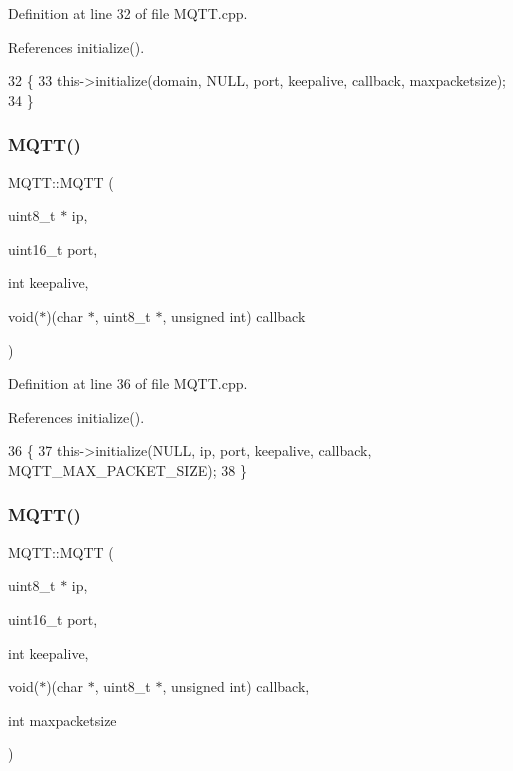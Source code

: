 Definition at line 32 of file M\+Q\+T\+T.\+cpp.



References initialize().


\begin{DoxyCode}
32                                                                                                            
                  \{
33     this->initialize(domain, NULL, port, keepalive, callback, maxpacketsize);
34 \}
\end{DoxyCode}
\mbox{\label{class_m_q_t_t_ad68f2a18a197fa8944e8cc8e1950af5a}} 
\subsubsection{M\+Q\+T\+T()\hspace{0.1cm}{\footnotesize\ttfamily [8/9]}}
{\footnotesize\ttfamily M\+Q\+T\+T\+::\+M\+Q\+TT (\begin{DoxyParamCaption}\item[{uint8\+\_\+t $\ast$}]{ip,  }\item[{uint16\+\_\+t}]{port,  }\item[{int}]{keepalive,  }\item[{void($\ast$)(char $\ast$, uint8\+\_\+t $\ast$, unsigned int)}]{callback }\end{DoxyParamCaption})}



Definition at line 36 of file M\+Q\+T\+T.\+cpp.



References initialize().


\begin{DoxyCode}
36                                                                                                    \{
37     this->initialize(NULL, ip, port, keepalive, callback, MQTT_MAX_PACKET_SIZE);
38 \}
\end{DoxyCode}
\mbox{\label{class_m_q_t_t_a86aa31266ec2193bdd166e9fcd8c9d79}} 
\subsubsection{M\+Q\+T\+T()\hspace{0.1cm}{\footnotesize\ttfamily [9/9]}}
{\footnotesize\ttfamily M\+Q\+T\+T\+::\+M\+Q\+TT (\begin{DoxyParamCaption}\item[{uint8\+\_\+t $\ast$}]{ip,  }\item[{uint16\+\_\+t}]{port,  }\item[{int}]{keepalive,  }\item[{void($\ast$)(char $\ast$, uint8\+\_\+t $\ast$, unsigned int)}]{callback,  }\item[{int}]{maxpacketsize }\end{DoxyParamCaption})}



